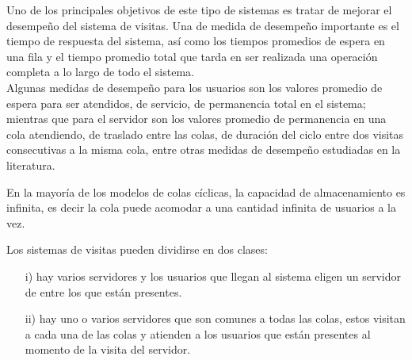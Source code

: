\documentclass{article}
\begin{document}
Uno de los principales objetivos de este tipo de sistemas es tratar de mejorar el desempe\~no del sistema de visitas. Una de medida de desempe\~no importante es el tiempo de respuesta del sistema, as\'i como los tiempos promedios de espera en una fila y el tiempo promedio total que tarda en ser realizada una operaci\'on completa a lo largo de todo el sistema.\\

Algunas medidas de desempe\~no para los usuarios son los valores promedio de espera para ser atendidos, de servicio, de permanencia total en el sistema; mientras que para el servidor son los valores promedio de permanencia en una cola atendiendo, de traslado entre las colas, de duraci\'on del ciclo entre dos visitas consecutivas a la misma cola, entre otras medidas de desempe\~no estudiadas en la literatura.


En la mayor\'ia de los modelos de colas c\'iclicas, la capacidad de almacenamiento es infinita, es decir la cola puede acomodar a una cantidad infinita de usuarios a la vez.

Los sistemas de visitas pueden dividirse en dos clases:
\begin{itemize}
\item[i)] hay varios servidores y los usuarios que llegan al sistema eligen un servidor de entre los que est\'an presentes.

\item[ii)] hay uno o varios servidores que son comunes a todas las colas, estos visitan a cada una de las colas y atienden a los usuarios que est\'an presentes al momento de la visita del
servidor.
\end{itemize}
\end{document}
